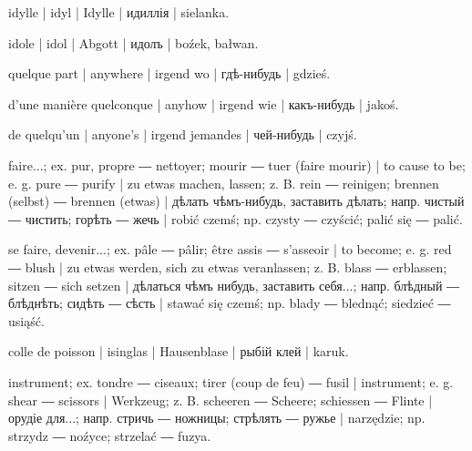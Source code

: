 \begin{outdent}{1em}
idylle | idyl | Idylle | идиллія | sielanka.

idole | idol | Abgott | идолъ | boźek, bałwan.

quelque part | anywhere | irgend wo | гдѣ-нибудь | gdzieś.

d’une manière quelconque | anyhow | irgend wie | какъ-нибудь | jakoś.

de quelqu’un | anyone’s | irgend jemandes | чей-нибудь | czyjś.

faire...; ex.  pur, propre ―  nettoyer; 
mourir ―  tuer (faire mourir) | to cause to be;
e. g.  pure ―  purify | zu etwas machen, lassen;
z. B.  rein ―  reinigen;  brennen (selbst) ―
 brennen (etwas) | дѣлать чѣмъ-нибудь, заставить дѣлать;
напр.  чистый ―  чистить;  горѣть ―
 жечь | robić czemś; np.  czysty ―  czyścić;
 palić się ―  palić.

se faire, devenir...; ex.  pâle ―  pâlir;
 être assis ―  s’asseoir | to become; e. g. 
red ―  blush | zu etwas werden, sich zu etwas veranlassen;
z. B.  blass ―  erblassen;  sitzen ―
 sich setzen | дѣлаться чѣмъ нибудь, заставить себя...;
напр.  блѣдный ―  блѣднѣть;  сидѣть ―
 сѣсть | stawać się czemś; np.  blady ― 
blednąć;  siedzieć ―  usiąść.

colle de poisson | isinglas | Hausenblase | рыбій клей | karuk.

instrument; ex.  tondre ―  ciseaux; 
tirer (coup de feu) ―  fusil | instrument; e. g. 
shear ―  scissors | Werkzeug; z. B.  scheeren ―
 Scheere;  schiessen ―  Flinte | орудіе
для...; напр.  стричь ―  ножницы;  стрѣлять
―  ружье | narzędzie; np.  strzydz ― 
noźyce;  strzelać ―  fuzya.


\end{outdent}
